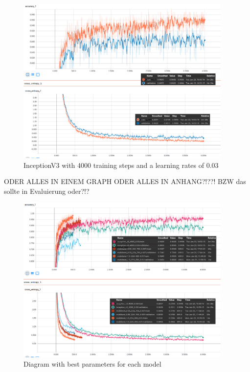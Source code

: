 \begin{figure}[htbp]
\centering
\includegraphics[width=0.95\textwidth]{includes/inception4000res}
\caption[InceptionV3 with 4000 training steps and a learning rates of 0.03]{InceptionV3 with 4000 training steps and a learning rates of 0.03}
\label{fig:inception4000res}
\end{figure}

ODER ALLES IN EINEM GRAPH  ODER ALLES IN ANHANG?!??! BZW das sollte in Evaluierung oder?!?

\begin{figure}[htbp]
\centering
\includegraphics[width=0.95\textwidth]{includes/AllRes}
\caption[Diagram with best parameters for each model]{Diagram with best parameters for each model}
\label{fig:AllRes}
\end{figure}



